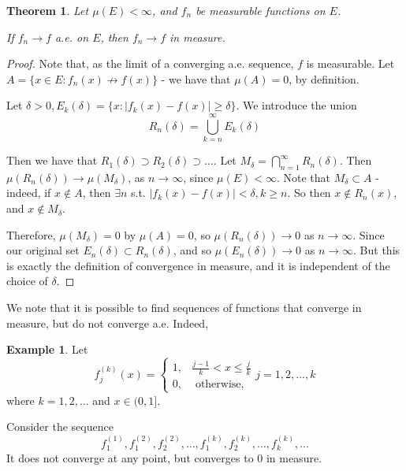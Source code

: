 \documentclass[11pt,a4paper]{report}
\theoremstyle{plain}
\newtheorem{thm}{Theorem}[section]
\theoremstyle{definition}
\newtheorem*{eg}{Example}
\theoremstyle{remark}
\newcommand{\Union}{\bigcup}
\newcommand{\Intersection}{\bigcap}
\newcommand{\abs}[1]{\left| #1 \right|}
\begin{document}
\begin{thm}
  Let $\mu(E) < \infty$, and $f_n$ be measurable functions on $E$.

  If $f_n \rightarrow f$ a.e. on $E$, then $f_n \rightarrow f$ in measure.
\end{thm}

\begin{proof}
  Note that, as the limit of a converging a.e. sequence, $f$ is measurable. Let $A = \{ x \in E : f_n(x) \not \rightarrow f(x) \}$ - we have that $\mu(A) = 0$, by definition.

    Let $\delta > 0, E_k(\delta) = \{ x : \abs{f_k(x) - f(x)} \ge \delta \}$. We introduce the union $$ R_n(\delta) = \Union_{k=n}^\infty E_k(\delta) $$

    Then we have that $R_1(\delta) \supset R_2(\delta) \supset \dots$. Let $ M_\delta = \Intersection_{n=1}^\infty R_n(\delta)$. Then $\mu(R_n(\delta)) \rightarrow \mu(M_\delta)$, as $n \rightarrow \infty$, since $\mu(E) < \infty$. Note that $M_\delta \subset A$ - indeed, if $x \not \in A$, then $\exists n$ s.t. $\abs{f_k(x) - f(x)} < \delta, k \ge n$. So then $x \not \in R_n(x)$, and $x \not \in M_\delta$.

    Therefore, $\mu(M_\delta) = 0$ by $\mu(A) = 0$, so $\mu(R_n(\delta)) \rightarrow 0$ as $n \rightarrow \infty$. Since our original set $E_n(\delta) \subset R_n(\delta)$, and so $\mu(E_n(\delta)) \rightarrow 0$ as $n \rightarrow \infty$. But this is exactly the definition of convergence in measure, and it is independent of the choice of $\delta$.
\end{proof}


We note that it is possible to find sequences of functions that converge in measure, but do not converge a.e. Indeed,

\begin{eg}
    Let 
    $$f_j^{(k)}(x) = \begin{cases}
        1, &\frac{j-1}{k} < x \le \frac{j}{k} \\
        0, &\text{ otherwise},
        \end{cases} j = 1, 2, \dots, k$$
    where $k = 1, 2, \dots$ and $x \in (0, 1]$.

    Consider the sequence 
    $$f_1^{(1)}, f_1^{(2)}, f_2^{(2)}, \dots, f_1^{(k)}, f_2^{(k)}, \dots, f_k^{(k)}, \dots$$
    It does not converge at any point, but converges to 0 in measure.
\end{eg}
\end{document}
